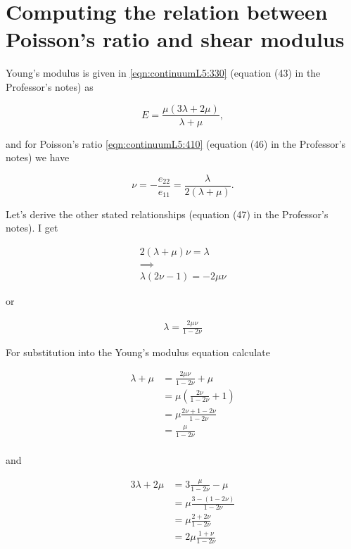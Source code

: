 \label{chap:appendix:poissonAndShearModulus}
\section{Computing the relation between Poisson's ratio and shear modulus}

Young's modulus is given in \ref{eqn:continuumL5:330} (equation (43) in the Professor's notes) as

\begin{equation}\label{eqn:continuumL6:490}
E = \frac{\mu(3 \lambda + 2 \mu)}{\lambda + \mu },
\end{equation}

and for Poisson's ratio \ref{eqn:continuumL5:410} (equation (46) in the Professor's notes) we have

\begin{equation}\label{eqn:continuumL6:510}
\nu = -\frac{e_{22}}{e_{11}} = \frac{\lambda}{2 (\lambda + \mu)}.
\end{equation}


Let's derive the other stated relationships (equation (47) in the Professor's notes).  I get

\begin{align*}
2 (\lambda + \mu) \nu = \lambda \\
\implies \\
\lambda ( 2 \nu - 1 ) = - 2\mu\nu
\end{align*}

or

\begin{align*}
\lambda = \frac{ 2 \mu \nu} { 1 - 2 \nu }
\end{align*}

For substitution into the Young's modulus equation calculate

\begin{align*}
\lambda + \mu 
&= \frac{ 2 \mu \nu} { 1 - 2 \nu } + \mu \\
&= \mu \left( \frac{ 2 \nu} { 1 - 2 \nu } + 1 \right)  \\
&= \mu \frac{ 2 \nu + 1 - 2 \nu} { 1 - 2 \nu }  \\
&= \frac{ \mu} { 1 - 2 \nu }  \\
\end{align*}

and 

\begin{align*}
3 \lambda + 2 \mu 
&= 3 \frac{ \mu} { 1 - 2 \nu } - \mu \\
&= \mu \frac{ 3 - (1 - 2 \nu)} { 1 - 2 \nu } \\
&= \mu \frac{ 2 + 2 \nu} { 1 - 2 \nu } \\
&= 2 \mu \frac{ 1 + \nu} { 1 - 2 \nu } \\
\end{align*}


